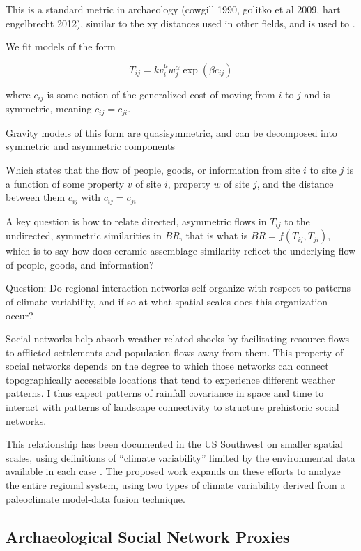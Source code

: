 \documentclass[fleqn,10pt]{wlscirep}
\begin{document}
This is a standard metric in archaeology (cowgill 1990, golitko et al 2009, hart engelbrecht 2012), similar to the xy distances used in other fields, and is used to .

We fit models of the form

$$T_{ij} = k v_i^\mu w_j^\alpha \exp(\beta c_{ij})$$

where $c_{ij}$ is some notion of the generalized cost of moving from $i$ to $j$ and is symmetric, meaning $c_{ij} = c_{ji}$.

Gravity models of this form are quasisymmetric, and can be decomposed into symmetric and asymmetric components


Which states that the flow of people, goods, or information from site $i$ to site $j$ is a function of some property $v$ of site $i$, property $w$ of site $j$, and the distance between them $c_{ij}$ with $c_{ij} = c_{ji}$

A key question is how to relate directed, asymmetric flows in $T_{ij}$ to the undirected, symmetric similarities in $BR$, that is what is $BR = f(T_{ij},T_{ji})$, which is to say how does ceramic assemblage similarity reflect the underlying flow of people, goods, and information?


Question: Do regional interaction networks self-organize with respect to patterns of climate variability, and if so at what spatial scales does this organization occur?

Social networks help absorb weather-related shocks by facilitating resource flows to afflicted settlements and population flows away from them. This property of social networks depends on the degree to which those networks can connect topographically accessible locations that tend to experience different weather patterns. I thus expect patterns of rainfall covariance in space and time to interact with patterns of landscape connectivity to structure prehistoric social networks.

This relationship has been documented in the US Southwest on smaller spatial scales, using definitions of ``climate variability'' limited by the environmental data available in each case \cite{Rautman1993a,Cordell2007MesaMigration,Strawhacker2017RiskProvince}. The proposed work expands on these efforts to analyze the entire regional system, using two types of climate variability derived from a paleoclimate model-data fusion technique.

\subsection*{Archaeological Social Network Proxies}
\end{document}
